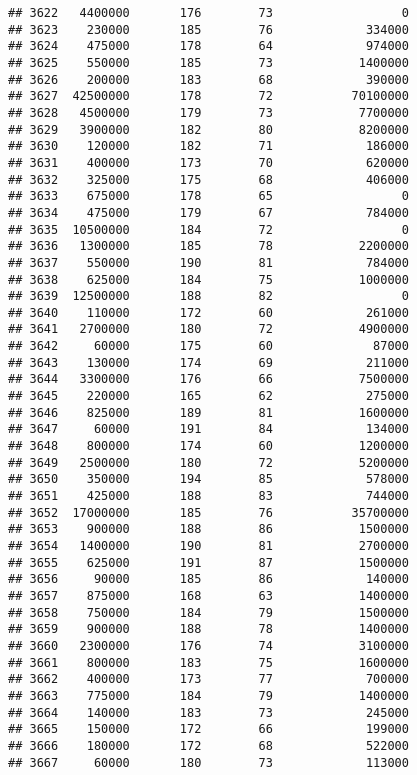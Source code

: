 \documentclass[
]{article}
\begin{document}
\begin{verbatim}
## 3622   4400000       176        73                  0
## 3623    230000       185        76             334000
## 3624    475000       178        64             974000
## 3625    550000       185        73            1400000
## 3626    200000       183        68             390000
## 3627  42500000       178        72           70100000
## 3628   4500000       179        73            7700000
## 3629   3900000       182        80            8200000
## 3630    120000       182        71             186000
## 3631    400000       173        70             620000
## 3632    325000       175        68             406000
## 3633    675000       178        65                  0
## 3634    475000       179        67             784000
## 3635  10500000       184        72                  0
## 3636   1300000       185        78            2200000
## 3637    550000       190        81             784000
## 3638    625000       184        75            1000000
## 3639  12500000       188        82                  0
## 3640    110000       172        60             261000
## 3641   2700000       180        72            4900000
## 3642     60000       175        60              87000
## 3643    130000       174        69             211000
## 3644   3300000       176        66            7500000
## 3645    220000       165        62             275000
## 3646    825000       189        81            1600000
## 3647     60000       191        84             134000
## 3648    800000       174        60            1200000
## 3649   2500000       180        72            5200000
## 3650    350000       194        85             578000
## 3651    425000       188        83             744000
## 3652  17000000       185        76           35700000
## 3653    900000       188        86            1500000
## 3654   1400000       190        81            2700000
## 3655    625000       191        87            1500000
## 3656     90000       185        86             140000
## 3657    875000       168        63            1400000
## 3658    750000       184        79            1500000
## 3659    900000       188        78            1400000
## 3660   2300000       176        74            3100000
## 3661    800000       183        75            1600000
## 3662    400000       173        77             700000
## 3663    775000       184        79            1400000
## 3664    140000       183        73             245000
## 3665    150000       172        66             199000
## 3666    180000       172        68             522000
## 3667     60000       180        73             113000

\end{verbatim}
\end{document}
